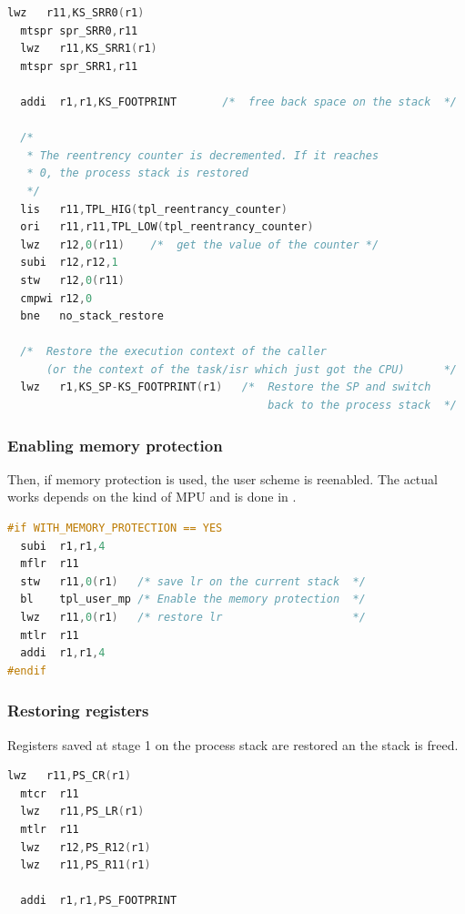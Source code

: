 \begin{lstlisting}[language=C]
  lwz   r11,KS_SRR0(r1)
  mtspr spr_SRR0,r11
  lwz   r11,KS_SRR1(r1)
  mtspr spr_SRR1,r11

  addi  r1,r1,KS_FOOTPRINT       /*  free back space on the stack  */
  
  /*
   * The reentrency counter is decremented. If it reaches
   * 0, the process stack is restored
   */
  lis   r11,TPL_HIG(tpl_reentrancy_counter)
  ori   r11,r11,TPL_LOW(tpl_reentrancy_counter)
  lwz   r12,0(r11)    /*  get the value of the counter */
  subi  r12,r12,1
  stw   r12,0(r11)
  cmpwi r12,0
  bne   no_stack_restore

  /*  Restore the execution context of the caller
      (or the context of the task/isr which just got the CPU)      */
  lwz   r1,KS_SP-KS_FOOTPRINT(r1)   /*  Restore the SP and switch
                                        back to the process stack  */
\end{lstlisting}

\subsubsection{Enabling memory protection}

Then, if memory protection is used, the user scheme is reenabled. The actual works depends on the kind of MPU and is done in .

\begin{lstlisting}[language=C]
#if WITH_MEMORY_PROTECTION == YES
  subi  r1,r1,4
  mflr  r11
  stw   r11,0(r1)   /* save lr on the current stack  */
  bl    tpl_user_mp /* Enable the memory protection  */
  lwz   r11,0(r1)   /* restore lr                    */
  mtlr  r11
  addi  r1,r1,4
#endif
\end{lstlisting}

\subsubsection{Restoring registers}

Registers saved at stage 1 on the process stack are restored an the stack is freed.

\begin{lstlisting}[language=C]
  lwz   r11,PS_CR(r1)
  mtcr  r11
  lwz   r11,PS_LR(r1)
  mtlr  r11
  lwz   r12,PS_R12(r1)
  lwz   r11,PS_R11(r1)

  addi  r1,r1,PS_FOOTPRINT
\end{lstlisting}

